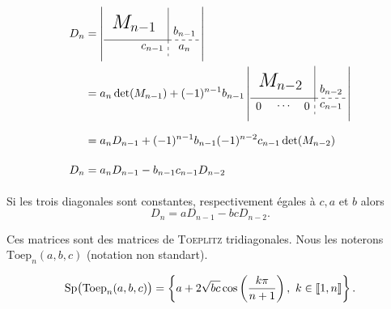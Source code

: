\newcommand{\dettrignmoinsun}{
\left|\begin{gathered}
    \tikzpicture[every node/.style={anchor=south west}]
        \node[minimum width=1.5cm,minimum height=1cm] at (0.125,0.5) {\LARGE $M_{n-2}$};
        \node[minimum width=0.5cm,minimum height=0.5cm] at (0,0) {$0$};
        \node[minimum width=0.5cm,minimum height=0.5cm] at (0.7,0) {$\cdots$};
        \node[minimum width=0.5cm,minimum height=0.5cm] at (1.5,0) {$0$};
        \node[minimum width=1cm,minimum height=0.5cm] at (2,0) {$c_{n-1}$};
        \node[minimum width=1cm,minimum height=1cm] at (2,0.25) {$b_{n-2}$};
        \draw (0,0.5) -- (2,0.5);
        \draw (2,0.5) -- (2,1.5);
        \draw[dashed] (2,0.5) -- (3,0.5);
        \draw[dashed] (2,0.5) -- (2,0);
    \endtikzpicture
    \end{gathered}\right|
}

\begin{preuve}
    \begin{align*}
        D_n &= \dettrign \\
            &= a_n \det(M_{n-1}) + (-1)^{n-1} b_{n-1} \dettrignmoinsun \\
            &= a_n D_{n-1} + (-1)^{n-1} b_{n-1} (-1)^{n-2} c_{n-1} \det(M_{n-2}) \\
        D_n &= a_n D_{n-1} - b_{n-1} c_{n-1} D_{n-2}
    \end{align*}
\end{preuve}

\begin{corol} \label{relation_det_toep_trig}
    Si les trois diagonales sont constantes, respectivement égales à $c, a$ et $b$ alors
    $$D_n = aD_{n-1} - bc D_{n-2}.$$
\end{corol}


Ces matrices sont des matrices de \textsc{Toeplitz} tridiagonales. Nous les noterons $\mathrm{Toep}_n (a,b,c)$ (notation non standart). 

\begin{prop}{}
    $$\mathrm{Sp} \big( \mathrm{Toep}_n(a,b,c) \big) = \left \{ a + 2 \sqrt{bc} \cos \left( \frac{k \pi}{n+1} \right) ,\ k \in \llbracket 1, n \rrbracket \right \}.$$
\end{prop}

